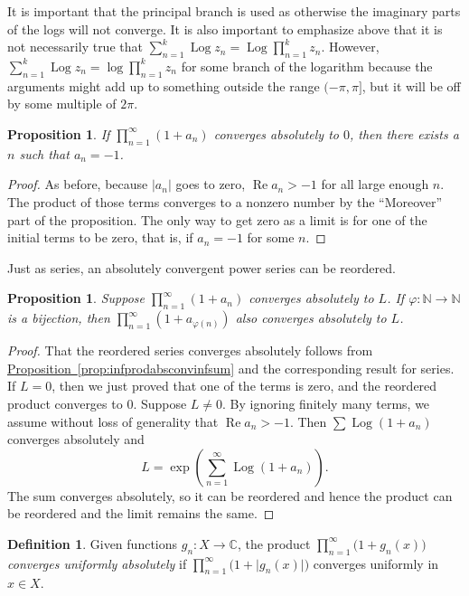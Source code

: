 \documentclass[12pt,openany]{book}
\renewcommand{\Re}{\operatorname{Re}}
\newcommand{\Log}{\operatorname{Log}}
\newcommand{\sabs}[1]{\lvert {#1} \rvert}
\newcommand{\C}{{\mathbb{C}}}
\newcommand{\N}{{\mathbb{N}}}
\newcommand{\myquote}[1]{``#1''}
\theoremstyle{plain}
\newtheorem{prop}[thm]{Proposition}
\theoremstyle{remark}
\theoremstyle{definition}
\newtheorem{defn}[thm]{Definition}
\theoremstyle{exercise}
\theoremstyle{example}
\newcommand{\propref}[1]{\hyperref[#1]{Proposition~\ref*{#1}}}
\begin{document}
It is important that the principal branch is used as otherwise the imaginary
parts of the logs will not converge.  It is also important to emphasize
above that it is not necessarily true that
$\sum_{n=1}^k \Log z_n = \Log \prod_{n=1}^k z_n$.
However,
$\sum_{n=1}^k \Log z_n = \log \prod_{n=1}^k z_n$ for some branch of the
logarithm because the arguments might add up to something outside the range
$(-\pi,\pi]$, but it will be off by some multiple of $2\pi$.


\begin{prop}
If $\prod_{n=1}^\infty (1+a_n)$ converges absolutely to $0$, then there
exists a $n$ such that $a_n=-1$.
\end{prop}

\begin{proof}
As before, because $\sabs{a_n}$ goes to zero,
$\Re a_n > -1$ for all large enough $n$.  The product
of those terms converges to a nonzero number by the \myquote{Moreover} part of the
proposition.  The only way to get zero as a limit is for one of the initial
terms to be zero, that is, if $a_n=-1$ for some $n$.
\end{proof}

Just as series, an absolutely convergent power series can be reordered.

\begin{prop}
Suppose $\prod_{n=1}^\infty (1+a_n)$ converges absolutely to $L$.
If $\varphi \colon \N \to \N$ is a bijection, then 
$\prod_{n=1}^\infty (1+a_{\varphi(n)})$ also converges absolutely to $L$.
\end{prop}

\begin{proof}
That the reordered series converges absolutely follows from 
\propref{prop:infprodabsconvinfsum} and the corresponding result for series.
If $L=0$, then we just proved that one of the terms is zero,
and the reordered product converges to $0$.
Suppose $L\not= 0$.
By ignoring finitely many terms, we assume without loss of generality
that $\Re a_n > -1$.  Then $\sum \Log(1+a_n)$ converges absolutely and
\begin{equation*}
L = \exp\left(\sum_{n=1}^\infty \Log(1+a_n)\right) .
\end{equation*}
The sum converges absolutely, so it can be reordered and hence the product
can be reordered and the limit remains the same.
\end{proof}

\begin{defn}
Given functions $g_n \colon X \to \C$, the product
$\prod_{n=1}^{\infty} \bigl(1+g_n(x)\bigr)$ 
\emph{converges uniformly absolutely}%
%
if
$\prod_{n=1}^{\infty} \bigl(1+\sabs{g_n(x)}\bigr)$ 
converges uniformly in $x \in X$.
\end{defn}
\end{document}

